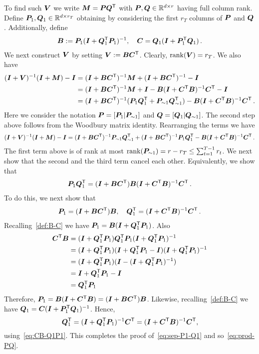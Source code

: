 To find such ${\bm{V}}$ we write ${\bm{M}} = {\bm{P}} {\bm{Q}}^{{\sf T}}$ with ${\bm{P}},{\bm{Q}}\in\mathbb{R}^{d\times r}$ having full column rank. Define ${\bm{P}}_1,{\bm{Q}}_1\in\mathbb{R}^{d\times r_T}$ obtaining by considering the first $r_T$ columns of ${\bm{P}}$ and ${\bm{Q}}$. Additionally, define
\begin{align}\label{def:B-C}
{\bm{B}} := {\bm{P}}_1(\bm{I}+{\bm{Q}}_1^{\sf T} {\bm{P}}_1)^{-1},\quad {\bm{C}} = {\bm{Q}}_1(\bm{I}+{\bm{P}}_1^{\sf T} {\bm{Q}}_1)\,.
\end{align}
We next construct ${\bm{V}}$ by setting ${\bm{V}}: = {\bm{B}}{\bm{C}}^{\sf T}$. Clearly, $\operatorname{rank}({\bm{V}}) = r_T$. We also have
\begin{align*}
    (\bm{I}+{\bm{V}})^{-1}(\bm{I}+{\bm{M}})-\bm{I} &= (\bm{I}+{\bm{B}}{\bm{C}}^{\sf T})^{-1}{\bm{M}} + (\bm{I}+{\bm{B}}{\bm{C}}^{\sf T})^{-1}-\bm{I}\\
    &= (\bm{I}+{\bm{B}}{\bm{C}}^{\sf T})^{-1}{\bm{M}} + \bm{I}- {\bm{B}}(\bm{I}+{\bm{C}}^{\sf T}{\bm{B}})^{-1}{\bm{C}}^{\sf T}-\bm{I}\\
    &= (\bm{I}+{\bm{B}}{\bm{C}}^{\sf T})^{-1} ({\bm{P}}_1{\bm{Q}}_1^{\sf T}+ {\bm{P}}_{\sim1}{\bm{Q}}_{\sim1}^{\sf T})- {\bm{B}}(\bm{I}+{\bm{C}}^{\sf T}{\bm{B}})^{-1}{\bm{C}}^{\sf T}\,.
\end{align*}
Here we consider the notation ${\bm{P}}= [{\bm{P}}_1 | {\bm{P}}_{\sim1}]$ and  ${\bm{Q}}= [{\bm{Q}}_1 | {\bm{Q}}_{\sim1}]$. The second step above follows from the Woodbury matrix identity. Rearranging the terms we have
\begin{align}\label{eq:induction1}
   (\bm{I}+{\bm{V}})^{-1}(\bm{I}+{\bm{M}}) -\bm{I} =   (\bm{I}+{\bm{B}}{\bm{C}}^{\sf T})^{-1}{\bm{P}}_{\sim1}{\bm{Q}}_{\sim1}^{\sf T} + (\bm{I}+{\bm{B}}{\bm{C}}^{\sf T})^{-1}{\bm{P}}_{1}{\bm{Q}}_{1}^{\sf T} - {\bm{B}}(\bm{I}+{\bm{C}}^{\sf T}{\bm{B}})^{-1}{\bm{C}}^{\sf T}\,.
\end{align}
The first term above is of rank at most $\operatorname{rank}({\bm{P}}_{\sim1}) = r- r_T\le \sum_{t=1}^{T-1}r_t$. We next show that the second and the third term cancel each other. Equivalently, we show that
\begin{align}\label{eq:prod-PQ}
{\bm{P}}_{1}{\bm{Q}}_{1}^{\sf T} = (\bm{I}+{\bm{B}}{\bm{C}}^{\sf T}){\bm{B}}(\bm{I}+{\bm{C}}^{\sf T}{\bm{B}})^{-1}{\bm{C}}^{\sf T}\,.
\end{align}
To do this, we next show that 
\begin{align}\label{eq:sep-P1-Q1}
{\bm{P}}_1 = (\bm{I}+{\bm{B}}{\bm{C}}^{\sf T}){\bm{B}}, \quad {\bm{Q}}_1^{\sf T} = (\bm{I}+{\bm{C}}^{\sf T}{\bm{B}})^{-1}{\bm{C}}^{\sf T}\,.
\end{align}
Recalling~\eqref{def:B-C} we have ${\bm{P}}_1 = {\bm{B}} (\bm{I}+{\bm{Q}}_1^{\sf T} {\bm{P}}_1)$. Also 
\begin{align}
{\bm{C}}^{\sf T}{\bm{B}} &=  (\bm{I} +{\bm{Q}}_1^{\sf T} {\bm{P}}_1){\bm{Q}}_1^{\sf T} {\bm{P}}_1(\bm{I}+{\bm{Q}}_1^{\sf T} {\bm{P}}_1)^{-1} \nonumber\\
&= (\bm{I} +{\bm{Q}}_1^{\sf T} {\bm{P}}_1)(\bm{I}+{\bm{Q}}_1^{\sf T} {\bm{P}}_1-\bm{I})(\bm{I}+{\bm{Q}}_1^{\sf T} {\bm{P}}_1)^{-1}\nonumber\\
&= (\bm{I} +{\bm{Q}}_1^{\sf T} {\bm{P}}_1)(\bm{I}-(\bm{I}+{\bm{Q}}_1^{\sf T} {\bm{P}}_1)^{-1})\\
&= \bm{I} +{\bm{Q}}_1^{\sf T} {\bm{P}}_1 -\bm{I}\nonumber\\
&= {\bm{Q}}_1^{\sf T}{\bm{P}}_1\label{eq:CB-Q1P1}
\end{align}
Therefore, ${\bm{P}}_1 = {\bm{B}}(\bm{I}+ {\bm{C}}^{\sf T} {\bm{B}}) = (\bm{I}+{\bm{B}}{\bm{C}}^{\sf T}){\bm{B}}$. Likewise, recalling~\eqref{def:B-C} we have ${\bm{Q}}_1 = {\bm{C}} (\bm{I}+ {\bm{P}}_1^{\sf T}{\bm{Q}}_1)^{-1}$. Hence,
\[
{\bm{Q}}_1^{\sf T} = (\bm{I} +{\bm{Q}}_1^{\sf T} {\bm{P}}_1)^{-1} {\bm{C}}^{\sf T} = (\bm{I} +{\bm{C}}^{\sf T}{\bm{B}})^{-1} {\bm{C}}^{\sf T},
\]
using~\eqref{eq:CB-Q1P1}. This completes the proof of~\eqref{eq:sep-P1-Q1} and so~\eqref{eq:prod-PQ}.

